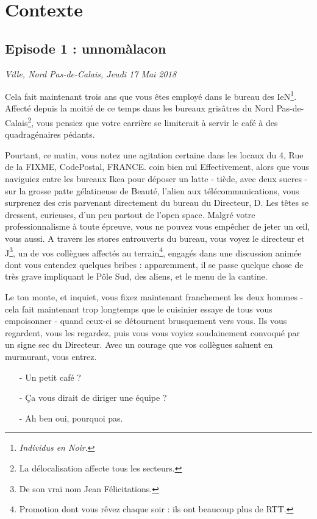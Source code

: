 \newpage

\section{Contexte}
\subsection{Episode 1 : unnomàlacon}
\hfill \textit{Ville, Nord Pas-de-Calais, Jeudi 17 Mai 2018}

Cela fait maintenant trois ans que vous êtes employé dans le bureau des
IeN\footnote{\emph{Individus en Noir}\texttrademark.}.  Affecté depuis la moitié
de ce temps dans les bureaux grisâtres du Nord Pas-de-Calais\footnote{La
délocalisation affecte tous les secteurs.}, vous pensiez que votre carrière se
limiterait à servir le café à des quadragénaires pédants. 

Pourtant, ce matin, vous notez une agitation certaine dans les locaux du 4, Rue
de la FIXME, CodePostal, FRANCE. %
coin bien nul Effectivement, alors que vous naviguiez entre les bureaux Ikea
pour déposer un latte - tiède, avec deux sucres - sur la grosse patte
gélatineuse de Beauté, l'alien aux télécommunications, vous surprenez des cris
parvenant directement du bureau du Directeur, D. Les têtes se dressent,
curieuses, d'un peu partout de l'open space. Malgré votre professionnalisme à
toute épreuve, vous ne pouvez vous empêcher de jeter un œil, vous aussi. A
travers les stores entrouverts du bureau, vous voyez le directeur et
J\footnote{De son vrai nom Jean Félicitations.}, un de vos collègues affectés au
terrain\footnote{Promotion dont vous rêvez chaque soir : ils ont beaucoup plus
de RTT.}, engagés dans une discussion animée dont vous entendez quelques bribes
: apparemment, il se passe quelque chose de très grave impliquant le Pôle Sud,
des aliens, et le menu de la cantine.

Le ton monte, et inquiet, vous fixez maintenant franchement les deux hommes -
cela fait maintenant trop longtemps que le cuisinier essaye de tous vous
empoisonner - quand ceux-ci se détournent brusquement vers vous. Ils vous
regardent, vous les regardez, puis vous vous voyiez soudainement convoqué par un
signe sec du Directeur. Avec un courage que vos collègues saluent en murmurant,
vous entrez.

\begin{itemize}
\item[-] Un petit café ?
\item[-] Ça vous dirait de diriger une équipe ?
\item[-] Ah ben oui, pourquoi pas.
\end{itemize}

